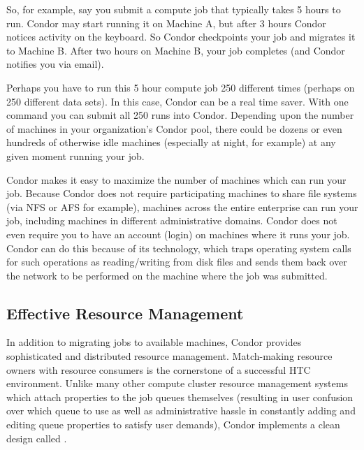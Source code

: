 So, for example, say you submit a compute job that typically takes 5
hours to run. Condor may start running it on Machine A, but after 3
hours Condor notices activity on the keyboard. So Condor checkpoints
your job and migrates it to Machine B. After two hours on Machine B,
your job completes (and Condor notifies you via email). 

Perhaps you have to run this 5 hour compute job 250 different times
(perhaps on 250 different data sets). In this case, Condor can be a real
time saver. With one command you can submit all 250 runs into Condor.
Depending upon the number of machines in your organization's Condor
pool, there could be dozens or even hundreds of otherwise idle machines
(especially at night, for example) at any given moment running your
job. 

Condor makes it easy to maximize the number of machines which can run
your job. Because Condor does not require participating machines to
share file systems (via NFS or AFS for example), machines across the
entire enterprise can run your job, including machines in different
administrative domains. Condor does not even require you to have an
account (login) on machines where it runs your job. Condor can do this
because of its  technology, which traps
operating system calls for such operations as reading/writing from disk
files and sends them back over the network to be performed on the machine
where the job was submitted. 

\subsection{Effective Resource Management}

In addition to migrating jobs to available machines, Condor provides
sophisticated and distributed resource management. Match-making resource
owners with resource consumers is the cornerstone of a successful HTC
environment. Unlike many other compute cluster resource management
systems which attach properties to the job queues themselves (resulting
in user confusion over which queue to use as well as administrative
hassle in constantly adding and editing queue properties to satisfy user
demands), Condor implements a clean design called . 

